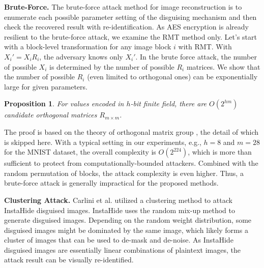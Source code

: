 \documentclass[conference]{IEEEtran}
\newtheorem{prop}{Proposition}
\begin{document}
\textbf{Brute-Force.} The brute-force attack method for image reconstruction is to enumerate each possible parameter setting of the disguising mechanism and then check the recovered result with re-identification. As AES encryption is already resilient to the brute-force attack, we examine the RMT method only. Let's start with a block-level transformation for any image block $i$ with RMT. With $X_i' = X_iR_i$, the adversary knows only $X_i'$. In the brute force attack, the number of possible $X_i$ is determined by the number of possible $R_i$ matrices. We show that the number of possible $R_i$ (even limited to orthogonal ones) can be exponentially large for given parameters. 
\begin{prop} For values encoded in $h$-bit finite field, there are $O(2^{hm})$ candidate orthogonal matrices $R_{m\times m}$. 
\end{prop}
The proof is based on the theory of orthogonal matrix group \cite{heiberger78}, the detail of which is skipped here. With a typical setting in our experiments, e.g., $h=8$ and $m=28$ for the MNIST dataset, the overall complexity is $O(2^{224})$, which is more than sufficient to protect from computationally-bounded attackers. Combined with the random permutation of blocks, the attack complexity is even higher. Thus, a brute-force attack is generally impractical for the proposed methods. 


\textbf{Clustering Attack.}
Carlini et al. \cite{carlini21} utilized a clustering method to attack InstaHide \cite{huang20} disguised images. InstaHide uses the random mix-up method to generate disguised images. Depending on the random weight distribution, some disguised images might be dominated by the same image, which likely forms a cluster of images that can be used to de-mask and de-noise. As InstaHide disguised images are essentially linear combinations of plaintext images, the attack result can be visually re-identified. 
\end{document}
